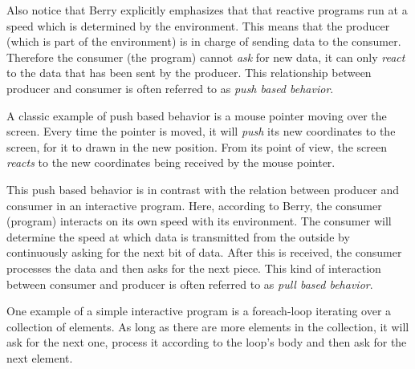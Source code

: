 Also notice that Berry explicitly emphasizes that that reactive programs run at a speed which is determined by the environment. This means that the producer (which is part of the environment) is in charge of sending data to the consumer. Therefore the consumer (the program) cannot \emph{ask} for new data, it can only \emph{react} to the data that has been sent by the producer. This relationship between producer and consumer is often referred to as \textit{push based behavior}.

A classic example of push based behavior is a mouse pointer moving over the screen. Every time the pointer is moved, it will \emph{push} its new coordinates to the screen, for it to drawn in the new position. From its point of view, the screen \emph{reacts} to the new coordinates being received by the mouse pointer.

This push based behavior is in contrast with the relation between producer and consumer in an interactive program. Here, according to Berry, the consumer (program) interacts on its own speed with its environment. The consumer will determine the speed at which data is transmitted from the outside by continuously asking for the next bit of data. After this is received, the consumer processes the data and then asks for the next piece. This kind of interaction between consumer and producer is often referred to as \textit{pull based behavior}.

One example of a simple interactive program is a foreach-loop iterating over a collection of elements. As long as there are more elements in the collection, it will ask for the next one, process it according to the loop's body and then ask for the next element.